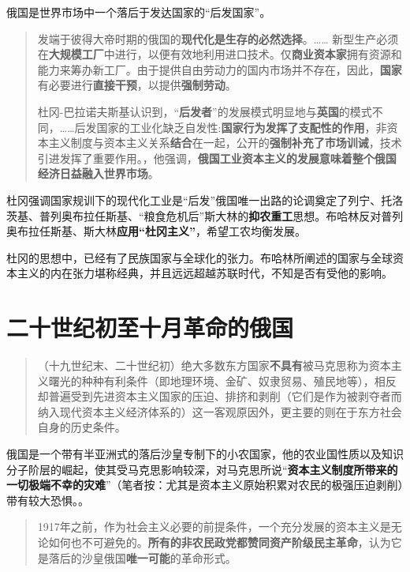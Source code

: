 俄国是世界市场中一个落后于发达国家的“后发国家”。
\begin{quotation}发端于彼得大帝时期的俄国的\textbf{现代化是生存的必然选择}。…… 新型生产必须在\textbf{大规模工厂}中进行，以便有效地利用进口技术。仅\textbf{商业资本家}拥有资源和能力来筹办新工厂。由于提供自由劳动力的国内市场并不存在，因此，\textbf{国家}有必要进行\textbf{直接干预}，以提供\textbf{强制劳动}。

  杜冈-巴拉诺夫斯基认识到，“\textbf{后发者}”的发展模式明显地与\textbf{英国}的模式不同，……后发国家的工业化缺乏自发性:\textbf{国家行为发挥了支配性的作用}，非资本主义制度与资本主义关系\textbf{结合}在一起，公开的\textbf{强制补充了市场训诫}，技术引进发挥了重要作用。，他强调，\textbf{俄国工业资本主义的发展意味着整个俄国经济日益融入世界市场}。
\end{quotation}

杜冈强调国家规训下的现代化工业是“后发”俄国唯一出路的论调奠定了列宁、托洛茨基、普列奥布拉任斯基、“粮食危机后”斯大林的\textbf{抑农重工}思想。布哈林反对普列奥布拉任斯基、斯大林\textbf{应用“杜冈主义”}，希望工农均衡发展。

杜冈的思想中，已经有了民族国家与全球化的张力。布哈林所阐述的国家与全球资本主义的内在张力堪称经典，并且远远超越苏联时代，不知是否有受他的影响。

\section{二十世纪初至十月革命的俄国}

\begin{quotation}（十九世纪末、二十世纪初）绝大多数东方国家\textbf{不具有}被马克思称为资本主义曙光的种种有利条件（即地理环境、金矿、奴隶贸易、殖民地等），相反却普遍受到先进资本主义国家的压迫、排挤和剥削（它们是作为被剥夺者而纳入现代资本主义经济体系的）这一客观原因外，更主要的则在于东方社会自身的历史条件。
\end{quotation}

俄国是一个带有半亚洲式的落后沙皇专制下的小农国家，他的农业国性质以及知识分子阶层的崛起，使其受马克思影响较深，对马克思所说“\textbf{资本主义制度所带来的一切极端不幸的灾难}”（笔者按：尤其是资本主义原始积累对农民的极强压迫剥削）带有较大恐惧。。

\begin{quotation} 1917年之前，作为社会主义必要的前提条件，一个充分发展的资本主义是无论如何也不可避免的。\textbf{所有的非农民政党都赞同资产阶级民主革命}，认为它是落后的沙皇俄国\textbf{唯一可能}的革命形式。
\end{quotation}

